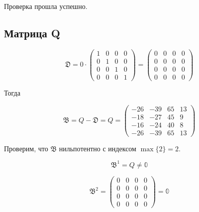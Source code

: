 \documentclass[12pt, a4paper]{article}
\begin{document}
    Проверка прошла успешно.



    \subsection{Матрица Q}
    

    \begin{equation}
        \mathfrak{D} = 0 \cdot \left(\begin{matrix}
            1 & 0 & 0 & 0 \\
            0 & 1 & 0 & 0 \\
            0 & 0 & 1 & 0 \\
            0 & 0 & 0 & 1
        \end{matrix}\right) = \left(\begin{matrix}
            0 & 0 & 0 & 0 \\
            0 & 0 & 0 & 0 \\
            0 & 0 & 0 & 0 \\
            0 & 0 & 0 & 0
        \end{matrix}\right)
    \end{equation}


    Тогда 

    \begin{equation}
        \mathfrak{B} = Q - \mathfrak{D} = Q = 
        \left(\begin{matrix}
            -26 & -39 & 65 & 13 \\
            -18 & -27 & 45 & 9 \\
            -16 & -24 & 40 & 8 \\
            -26 & -39 & 65 & 13
        \end{matrix}\right)
    \end{equation}

    Проверим, что $\mathfrak{B}$ нильпотентно с индексом $\max\{2\} = 2$.

    \begin{equation}
        \mathfrak{B}^1 = Q \neq \mathbb{0}
    \end{equation}

    \begin{equation}
        \mathfrak{B}^2 = \left(\begin{matrix}
            0 & 0 & 0 & 0 \\
            0 & 0 & 0 & 0 \\
            0 & 0 & 0 & 0 \\
            0 & 0 & 0 & 0
        \end{matrix}\right) = \mathbb{0}
    \end{equation}
\end{document}
